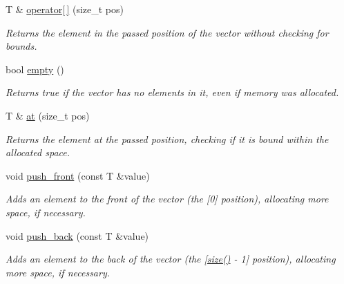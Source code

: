 \begin{DoxyCompactItemize}
\mbox{\label{classsc_1_1Vector_a90eca701f66fa5d49ecf0bf4232c1279}} 
T \& \hyperlink{classsc_1_1Vector_a90eca701f66fa5d49ecf0bf4232c1279}{operator\mbox{[}$\,$\mbox{]}} (size\+\_\+t pos)
\begin{DoxyCompactList}\small\item\em Returns the element in the passed position of the vector without checking for bounds. \end{DoxyCompactList}\item 
\mbox{\label{classsc_1_1Vector_ad32041924880336598c1a867d4cb9c81}} 
bool \hyperlink{classsc_1_1Vector_ad32041924880336598c1a867d4cb9c81}{empty} ()
\begin{DoxyCompactList}\small\item\em Returns true if the vector has no elements in it, even if memory was allocated. \end{DoxyCompactList}\item 
\mbox{\label{classsc_1_1Vector_a13736daa34984783b36b8abc0dfb8a5f}} 
T \& \hyperlink{classsc_1_1Vector_a13736daa34984783b36b8abc0dfb8a5f}{at} (size\+\_\+t pos)
\begin{DoxyCompactList}\small\item\em Returns the element at the passed position, checking if it is bound within the allocated space. \end{DoxyCompactList}\item 
\mbox{\label{classsc_1_1Vector_a25f84345bd4aec4c0c2b1780b2d71733}} 
void \hyperlink{classsc_1_1Vector_a25f84345bd4aec4c0c2b1780b2d71733}{push\+\_\+front} (const T \&value)
\begin{DoxyCompactList}\small\item\em Adds an element to the front of the vector (the \mbox{[}0\mbox{]} position), allocating more space, if necessary. \end{DoxyCompactList}\item 
\mbox{\label{classsc_1_1Vector_a0e237975592931cbd9c35322af6566a5}} 
void \hyperlink{classsc_1_1Vector_a0e237975592931cbd9c35322af6566a5}{push\+\_\+back} (const T \&value)
\begin{DoxyCompactList}\small\item\em Adds an element to the back of the vector (the \mbox{[}\hyperlink{classsc_1_1Vector_a2ccab0421fad94601e6bd5e344aa3340}{size()} -\/ 1\mbox{]} position), allocating more space, if necessary. \end{DoxyCompactList}\item 

\end{DoxyCompactItemize}
